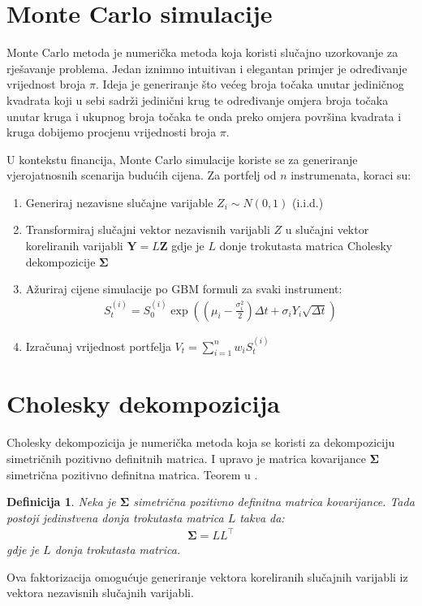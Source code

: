 \documentclass[zavrsnirad, upload]{fer}
\newtheorem{definition}{Definicija}
\begin{document}
\section{Monte Carlo simulacije}
\label{sek:monte_carlo}
Monte Carlo metoda je numerička metoda koja koristi slučajno
uzorkovanje za rješavanje problema.
Jedan iznimno intuitivan i elegantan primjer je određivanje
vrijednost broja $\pi$.
Ideja je generiranje što većeg broja točaka unutar jediničnog
kvadrata koji u sebi sadrži jedinični krug te određivanje
omjera broja točaka unutar kruga i ukupnog broja točaka te onda
preko omjera površina kvadrata i kruga dobijemo procjenu vrijednosti
broja $\pi$.

U kontekstu financija, Monte Carlo simulacije koriste se za
generiranje vjerojatnosnih scenarija budućih cijena.
Za portfelj od $n$ instrumenata, koraci su:
\begin{enumerate}
    \item Generiraj nezavisne slučajne varijable $Z_i \sim N(0,1)$ (i.i.d.)
\item Transformiraj slučajni vektor nezavisnih varijabli $Z$ u
    slučajni vektor koreliranih varijabli $\mathbf{Y} = L\mathbf{Z}$
    gdje je $L$ donje trokutasta matrica Cholesky
        dekompozicije $\boldsymbol{\Sigma}$
\item Ažuriraj cijene simulacije po GBM formuli za svaki instrument:
\begin{align}
S_t^{(i)} = S_0^{(i)} \exp\left(\left(\mu_i - \frac{\sigma_i^2}{2}\right)\Delta t + \sigma_i Y_i \sqrt{\Delta t}\right)
\end{align}
\item Izračunaj vrijednost portfelja $V_t = \sum_{i=1}^n w_i S_t^{(i)}$
\end{enumerate}

\section{Cholesky dekompozicija}
\label{sek:cholesky}
Cholesky dekompozicija je numerička metoda koja se koristi za
dekompoziciju simetričnih pozitivno definitnih matrica. I upravo
je matrica kovarijance $\boldsymbol{\Sigma}$ simetrična pozitivno
definitna matrica. Teorem u \cite{NumerickaMatematika}.
\begin{definition}
    \label{def:cholesky}
    Neka je $\boldsymbol{\Sigma}$ simetrična pozitivno definitna
    matrica kovarijance. Tada postoji jedinstvena donja trokutasta
    matrica $L$ takva da:
    \begin{align}
        \boldsymbol{\Sigma} = LL^\intercal
    \end{align}
    \indent gdje je $L$ donja trokutasta matrica.
\end{definition}
Ova faktorizacija omogućuje generiranje vektora koreliranih slučajnih varijabli
iz vektora nezavisnih slučajnih varijabli.
\end{document}
